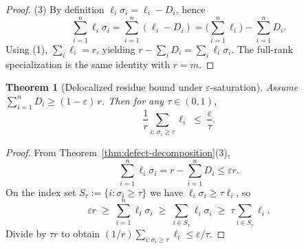 \documentclass{article}
\theoremstyle{plain}
\newtheorem{theorem}{Theorem}
\numberwithin{equation}{section}
\theoremstyle{definition}
\theoremstyle{remark}
\begin{document}
\begin{lemmaproofbox}
\begin{proof}
(3) By definition $\ell_i\sigma_i = \ell_i - D_i$, hence
\[
\sum_{i=1}^n \ell_i\sigma_i = \sum_{i=1}^n (\ell_i - D_i) = \Big(\sum_{i=1}^n \ell_i\Big) - \sum_{i=1}^n D_i.
\]
Using (1), $\sum_i \ell_i = r$, yielding $r-\sum_i D_i = \sum_i \ell_i\sigma_i$.
The full-rank specialization is the same identity with $r=m$.
\end{proof}
\end{lemmaproofbox}


\begin{lemmaproofbox}
\begin{theorem}[Delocalized residue bound under $\varepsilon$-saturation]\label{cor:tail-mass}
Assume $\sum_{i=1}^n D_i \ge (1-\varepsilon)\,r$. Then for any $\tau\in(0,1)$,
\[
\frac{1}{r}\sum_{i:\,\sigma_i\ge\tau}\ell_i
\;\le\;
\frac{\varepsilon}{\tau}.
\]
\end{theorem}

\begin{proof}
From Theorem~\ref{thm:defect-decomposition}(3),
\[
\sum_{i=1}^n \ell_i\sigma_i = r - \sum_{i=1}^n D_i \le \varepsilon r.
\]
On the index set $S_\tau := \{i:\sigma_i\ge\tau\}$ we have $\ell_i\sigma_i \ge \tau \ell_i$, so
\[
\varepsilon r \;\ge\; \sum_{i=1}^n \ell_i\sigma_i \;\ge\; \sum_{i\in S_\tau}\ell_i\sigma_i \;\ge\; \tau\sum_{i\in S_\tau}\ell_i.
\]
Divide by $\tau r$ to obtain $(1/r)\sum_{i:\sigma_i\ge\tau}\ell_i \le \varepsilon/\tau$.
\end{proof}
\end{lemmaproofbox}
\end{document}
